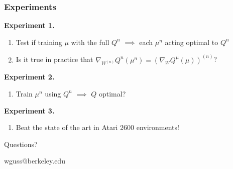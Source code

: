 \documentclass{beamer}
\numberwithin{equation}{subsection}
\numberwithin{theorem}{subsection}
\begin{document}
\begin{frame}
  \frametitle{Experiments}
  \textbf{Experiment 1.} 
  \begin{enumerate}
    \item Test if training $\mu$ with the full $Q^n$ $\implies$ each $\mu^n$ acting optimal to $Q^n$
    \item Is it true in practice that $\nabla_{W^{(n)}} Q^{n}(\mu^n) = \left(\nabla_{W} Q^\mu(\mu)\right)^{(n)}$?
  \end{enumerate}
    \textbf{Experiment 2.}
    \begin{enumerate}
      \item Train $\mu^n$ using $Q^n$ $\implies$ $Q$ optimal?
    \end{enumerate}
        \textbf{Experiment 3.}
    \begin{enumerate}
      \item Beat the state of the art in Atari 2600 environments! 
    \end{enumerate}
\end{frame}

\begin{frame}
\Huge{\centerline{Questions?}}
\Small\centerline{wguss@berkeley.edu}
\end{frame}

\end{document}
